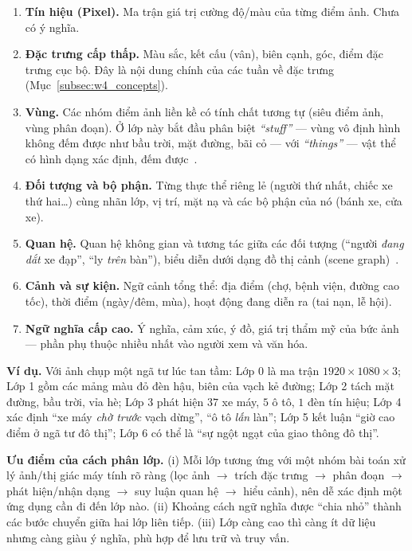 \begin{enumerate}[label=\textbf{Lớp \arabic*:}, leftmargin=*, start=0]
    \item \textbf{Tín hiệu (Pixel).} Ma trận giá trị cường độ/màu của từng điểm ảnh. Chưa có ý nghĩa.
    \item \textbf{Đặc trưng cấp thấp.} Màu sắc, kết cấu (vân), biên cạnh, góc, điểm đặc trưng cục bộ. Đây là nội dung chính của các tuần về đặc trưng (Mục~\ref{subsec:w4_concepts}).
    \item \textbf{Vùng.} Các nhóm điểm ảnh liền kề có tính chất tương tự (siêu điểm ảnh, vùng phân đoạn). Ở lớp này bắt đầu phân biệt \emph{``stuff''} — vùng vô định hình không đếm được như bầu trời, mặt đường, bãi cỏ — với \emph{``things''} — vật thể có hình dạng xác định, đếm được~\citep{heitz2008learning,kirillov2019panoptic}.
    \item \textbf{Đối tượng và bộ phận.} Từng thực thể riêng lẻ (người thứ nhất, chiếc xe thứ hai\ldots) cùng nhãn lớp, vị trí, mặt nạ và các bộ phận của nó (bánh xe, cửa xe).
    \item \textbf{Quan hệ.} Quan hệ không gian và tương tác giữa các đối tượng (``người \emph{đang dắt} xe đạp'', ``ly \emph{trên} bàn''), biểu diễn dưới dạng đồ thị cảnh (scene graph)~\citep{johnson2015image}.
    \item \textbf{Cảnh và sự kiện.} Ngữ cảnh tổng thể: địa điểm (chợ, bệnh viện, đường cao tốc), thời điểm (ngày/đêm, mùa), hoạt động đang diễn ra (tai nạn, lễ hội).
    \item \textbf{Ngữ nghĩa cấp cao.} Ý nghĩa, cảm xúc, ý đồ, giá trị thẩm mỹ của bức ảnh — phần phụ thuộc nhiều nhất vào người xem và văn hóa.
\end{enumerate}

\textbf{Ví dụ.} Với ảnh chụp một ngã tư lúc tan tầm: Lớp 0 là ma trận $1920 \times 1080 \times 3$; Lớp 1 gồm các mảng màu đỏ đèn hậu, biên của vạch kẻ đường; Lớp 2 tách mặt đường, bầu trời, vỉa hè; Lớp 3 phát hiện $37$ xe máy, $5$ ô tô, $1$ đèn tín hiệu; Lớp 4 xác định ``xe máy \emph{chờ trước} vạch dừng'', ``ô tô \emph{lấn} làn''; Lớp 5 kết luận ``giờ cao điểm ở ngã tư đô thị''; Lớp 6 có thể là ``sự ngột ngạt của giao thông đô thị''.

\textbf{Ưu điểm của cách phân lớp.} (i) Mỗi lớp tương ứng với một nhóm bài toán xử lý ảnh/thị giác máy tính rõ ràng (lọc ảnh $\rightarrow$ trích đặc trưng $\rightarrow$ phân đoạn $\rightarrow$ phát hiện/nhận dạng $\rightarrow$ suy luận quan hệ $\rightarrow$ hiểu cảnh), nên dễ xác định một ứng dụng cần đi đến lớp nào. (ii) Khoảng cách ngữ nghĩa được ``chia nhỏ'' thành các bước chuyển giữa hai lớp liên tiếp. (iii) Lớp càng cao thì càng ít dữ liệu nhưng càng giàu ý nghĩa, phù hợp để lưu trữ và truy vấn.

